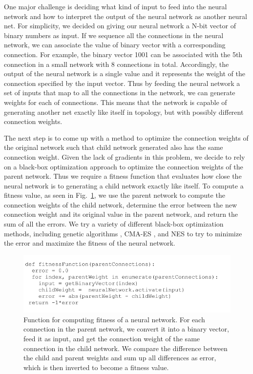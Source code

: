 \documentclass[12pt]{article}
\begin{document}
One major challenge is deciding what kind of input
to feed into the neural network and how to interpret the output
of the neural network as another neural net.
For simplicity,
we decided on giving our neural network a N-bit vector
of binary numbers as input.
If we sequence all the connections in the neural network,
we can associate the value of binary vector
with a corresponding connection.
For example, the binary vector 1001
can be associated with the 5th connection
in a small network with 8 connections in total.
Accordingly, the output of the neural network
is a single value
and it represents the weight
of the connection specified by the input vector.
Thus by feeding the neural network
a set of inputs that map to all the connections in the network,
we can generate weights for each of connections.
This means that the network is capable of generating another net
exactly like itself in topology,
but with possibly different connection weights. 

The next step is to come up with
a method to optimize the connection weights
of the original network such that child network generated
also has the same connection weight.
Given the lack of gradients in this problem,
we decide to rely on a black-box optimization approach
to optimize the connection weights of the parent network.
Thus we require a fitness function
that evaluates how close the neural network is
to generating a child network exactly like itself.
To compute a fitness value,
as seen in Fig.~\ref{pseudo},
we use the parent network
to compute the connection weights of the child network,
determine the error between the new connection weight
and its original value in the parent network,
and return the sum of all the errors.
We try a variety of different black-box optimization methods,
including genetic algorithms \cite{deb2002fast},
CMA-ES \cite{hansen2003reducing},
and NES \cite{wierstra2008natural}
to try to minimize the error
and maximize the fitness of the neural network.

\begin{figure}[h]
\begin{center}
  \includegraphics[width=0.8\linewidth]{pseudo.png}
\end{center}
   \caption{Function for computing fitness of a neural network.
For each connection in the parent network,
we convert it into a binary vector,
feed it as input,
and get the connection weight
of the same connection in the child network.
We compare the difference
between the child and parent weights
and sum up all differences as error,
which is then inverted to become a fitness value.}
\label{pseudo}
\end{figure} 
\end{document}
